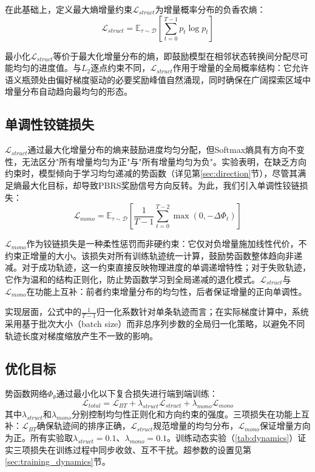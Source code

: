 在此基础上，定义最大熵增量约束$\mathcal{L}_{struct}$为增量概率分布的负香农熵：
\begin{equation}
\label{eq:lstruct}
    \mathcal{L}_{struct} = \mathbb{E}_{\tau \sim \mathcal{D}} \left[ \sum_{t=0}^{T-1} p_t \log p_t \right]
\end{equation}

最小化$\mathcal{L}_{struct}$等价于最大化增量分布的熵，即鼓励模型在相邻状态转换间分配尽可能均匀的进度值。与$L_2$逐点约束不同，$\mathcal{L}_{struct}$作用于增量的全局概率结构：它允许语义瓶颈处由偏好梯度驱动的必要奖励峰值自然涌现，同时确保在广阔探索区域中增量分布自动趋向最均匀的形态。

\subsection{单调性铰链损失}

$\mathcal{L}_{struct}$通过最大化增量分布的熵来鼓励进度均匀分配，但Softmax熵具有方向不变性，无法区分"所有增量均匀为正"与"所有增量均匀为负"。实验表明，在缺乏方向约束时，模型倾向于学习均匀递减的势函数（详见第\ref{sec:direction}节），尽管其满足熵最大化目标，却导致PBRS奖励信号方向反转。为此，我们引入单调性铰链损失：
\begin{equation}
\label{eq:lmono}
    \mathcal{L}_{mono} = \mathbb{E}_{\tau \sim \mathcal{D}} \left[ \frac{1}{T-1}\sum_{t=0}^{T-2} \max(0, -\Delta\Phi_t) \right]
\end{equation}

$\mathcal{L}_{mono}$作为铰链损失是一种柔性惩罚而非硬约束：它仅对负增量施加线性代价，不约束正增量的大小。该损失对所有训练轨迹统一计算，鼓励势函数整体趋向非递减。对于成功轨迹，这一约束直接反映物理进度的单调递增特性；对于失败轨迹，它作为温和的结构正则化，防止势函数学习到全局递减的退化模式。$\mathcal{L}_{struct}$与$\mathcal{L}_{mono}$在功能上互补：前者约束增量分布的均匀性，后者保证增量的正向单调性。

实现层面，公式中的$\frac{1}{T-1}$归一化系数针对单条轨迹而言；在实际梯度计算中，系统采用基于批次大小（batch size）而非总序列步数的全局归一化策略，以避免不同轨迹长度对梯度缩放产生不一致的影响。

\subsection{优化目标}
\label{sec:joint_objective}

势函数网络$\Phi_\theta$通过最小化以下复合损失进行端到端训练：
\begin{equation}
\label{eq:total_loss}
    \mathcal{L}_{total} = \mathcal{L}_{BT} + \lambda_{struct} \mathcal{L}_{struct} + \lambda_{mono} \mathcal{L}_{mono}
\end{equation}
其中$\lambda_{struct}$和$\lambda_{mono}$分别控制均匀性正则化和方向约束的强度。三项损失在功能上互补：$\mathcal{L}_{BT}$确保轨迹间的排序正确，$\mathcal{L}_{struct}$规范增量的均匀分布，$\mathcal{L}_{mono}$保证增量方向为正。所有实验取$\lambda_{struct} = 0.1$、$\lambda_{mono} = 0.1$。训练动态实验（\cref{tab:dynamics}）证实三项损失在训练过程中同步收敛、互不干扰。超参数的设置见第\ref{sec:training_dynamics}节。


